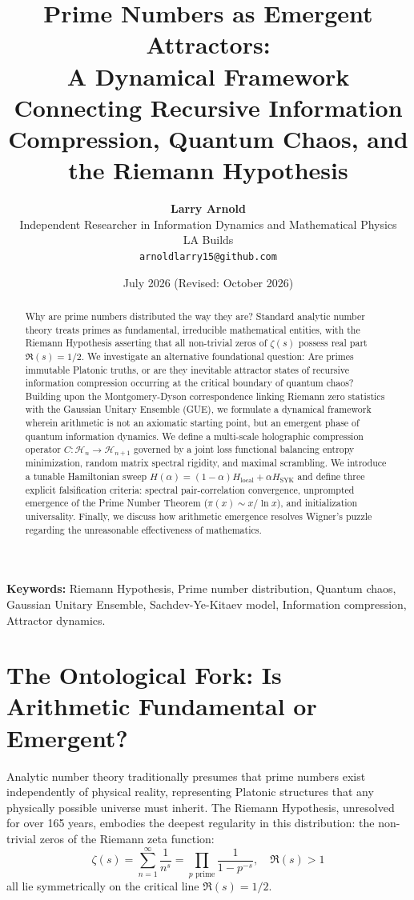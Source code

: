 \documentclass[11pt,a4paper]{article}
\title{\textbf{Prime Numbers as Emergent Attractors:\\A Dynamical Framework Connecting Recursive Information Compression, Quantum Chaos, and the Riemann Hypothesis}}
\author{
    \textbf{Larry Arnold}\\
    Independent Researcher in Information Dynamics and Mathematical Physics\\
    LA Builds\\
    \texttt{arnoldlarry15@github.com}
}
\date{July 2026 (Revised: October 2026)}
\begin{document}
\maketitle

\begin{abstract}
Why are prime numbers distributed the way they are? Standard analytic number theory treats primes as fundamental, irreducible mathematical entities, with the Riemann Hypothesis asserting that all non-trivial zeros of $\zeta(s)$ possess real part $\Re(s) = 1/2$. We investigate an alternative foundational question: Are primes immutable Platonic truths, or are they inevitable attractor states of recursive information compression occurring at the critical boundary of quantum chaos? Building upon the Montgomery-Dyson correspondence linking Riemann zero statistics with the Gaussian Unitary Ensemble (GUE), we formulate a dynamical framework wherein arithmetic is not an axiomatic starting point, but an emergent phase of quantum information dynamics. We define a multi-scale holographic compression operator $C: \mathcal{H}_n \to \mathcal{H}_{n+1}$ governed by a joint loss functional balancing entropy minimization, random matrix spectral rigidity, and maximal scrambling. We introduce a tunable Hamiltonian sweep $H(\alpha) = (1-\alpha)H_{\text{local}} + \alpha H_{\text{SYK}}$ and define three explicit falsification criteria: spectral pair-correlation convergence, unprompted emergence of the Prime Number Theorem ($\pi(x) \sim x / \ln x$), and initialization universality. Finally, we discuss how arithmetic emergence resolves Wigner's puzzle regarding the unreasonable effectiveness of mathematics.
\end{abstract}

\vspace{1em}
\noindent \textbf{Keywords:} Riemann Hypothesis, Prime number distribution, Quantum chaos, Gaussian Unitary Ensemble, Sachdev-Ye-Kitaev model, Information compression, Attractor dynamics.

\section{The Ontological Fork: Is Arithmetic Fundamental or Emergent?}
Analytic number theory traditionally presumes that prime numbers exist independently of physical reality, representing Platonic structures that any physically possible universe must inherit. The Riemann Hypothesis, unresolved for over 165 years, embodies the deepest regularity in this distribution: the non-trivial zeros of the Riemann zeta function:
\begin{equation}
\zeta(s) = \sum_{n=1}^\infty \frac{1}{n^s} = \prod_{p \text{ prime}} \frac{1}{1 - p^{-s}}, \quad \Re(s) > 1
\end{equation}
all lie symmetrically on the critical line $\Re(s) = 1/2$.
\end{document}
